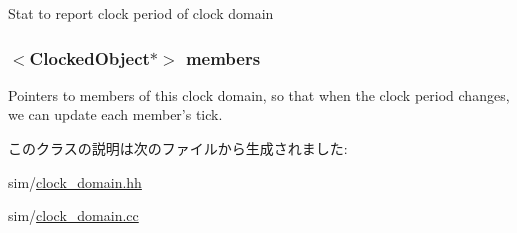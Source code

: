 \label{classClockDomain_a0073be3bd6bc1f374821ccaf28afb854}
Stat to report clock period of clock domain \hypertarget{classClockDomain_a9d30ae54f6ce7670d180f50b7ef81526}{
\subsubsection[{members}]{$<${\bf ClockedObject}$\ast$$>$ {\bf members}}}
\label{classClockDomain_a9d30ae54f6ce7670d180f50b7ef81526}
Pointers to members of this clock domain, so that when the clock period changes, we can update each member's tick. 

このクラスの説明は次のファイルから生成されました:\begin{DoxyCompactItemize}
\item 
sim/\hyperlink{clock__domain_8hh}{clock\_\-domain.hh}\item 
sim/\hyperlink{clock__domain_8cc}{clock\_\-domain.cc}\end{DoxyCompactItemize}
